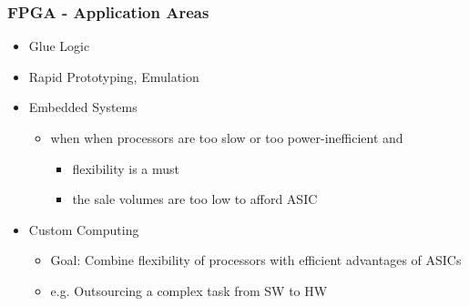 \subsubsection{FPGA - Application Areas}
\begin{itemize}
	\item Glue Logic
	\item Rapid Prototyping, Emulation
	\item Embedded Systems
	\begin{itemize}
		\item when when processors are too slow or too power-inefficient and
		\begin{itemize}
			\item flexibility is a must
			\item the sale volumes are too low to afford ASIC
		\end{itemize}
	\end{itemize}
	\item Custom Computing
		\begin{itemize}
			\item Goal: Combine flexibility of processors with efficient advantages of ASICs
			\item e.g. Outsourcing a complex task from SW to HW 
		\end{itemize}
\end{itemize}











